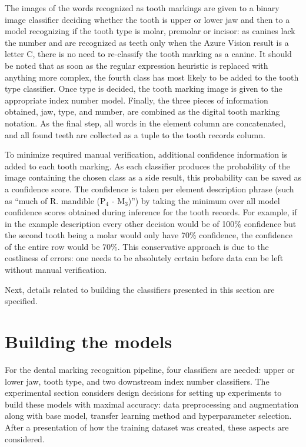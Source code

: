 \documentclass[english,twoside,openright]{UH_DS_MSc}
\begin{document}
The images of the words recognized as tooth markings are given to a binary image classifier deciding whether the tooth 
is upper or lower jaw and then to a model recognizing if the tooth type is molar, premolar or incisor: as 
canines lack the number and are recognized as teeth only when the Azure Vision result is a letter C, there is 
no need to re-classify the tooth marking as a canine. It should be noted that as soon as the regular expression
heuristic is replaced with anything more complex, the fourth class has most likely to be added to the tooth type classifier.
Once type is decided, the tooth marking image is given to the appropriate index number model. Finally, 
the three pieces of information obtained, jaw, type, and number, are combined as the digital tooth marking 
notation. As the final step, all words in the element column are concatenated, and all found teeth are 
collected as a tuple to the tooth records column.

To minimize required manual verification, additional confidence information is added 
to each tooth marking. As each classifier produces the probability of the image containing the 
chosen class as a side result, this probability can be saved as a confidence score. The confidence is taken 
per element description phrase (such as ``much of R. mandible ($\text{P}_4$ - $\text{M}_3$)'') by taking the minimum over all 
model confidence scores obtained during inference for the tooth records. For example, if in the 
example description every other decision would be of 100\% confidence but the second tooth being a molar 
would only have 70\% confidence, the confidence of the entire row would be 70\%. This conservative approach is 
due to the costliness of errors: one needs to be absolutely certain before data can be left without manual 
verification.

Next, details related to building the classifiers presented in this section are specified.

\section{Building the models}
\label{sect:building-models}

For the dental marking recognition pipeline, four classifiers are needed: upper or lower jaw, 
tooth type, and two downstream index number classifiers. The experimental 
section considers design decisions for setting up experiments to build these models with maximal accuracy:
 data preprocessing and augmentation along with base model,
transfer learning method and hyperparameter selection. After a presentation of  how the training dataset was created, these aspects are considered.
\end{document}
